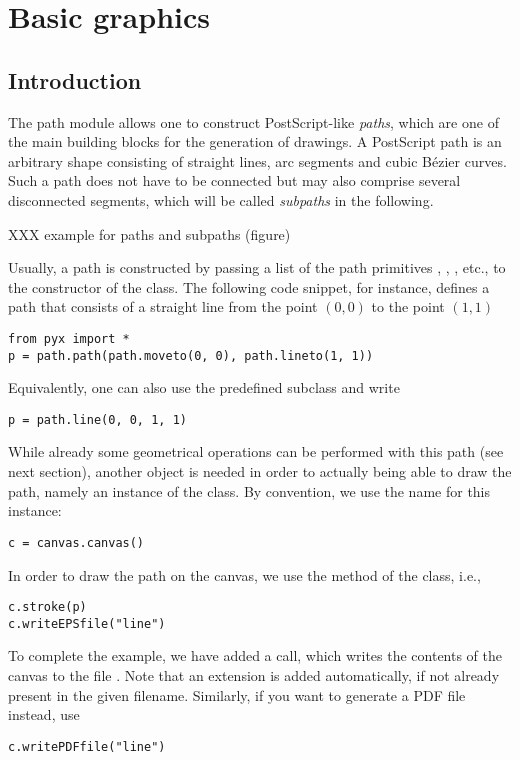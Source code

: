 \chapter{Basic graphics}


\label{graphics}

\section{Introduction}

The path module allows one to construct PostScript-like
\textit{paths}, which are one of the main building blocks for the
generation of drawings. A PostScript path is an arbitrary shape
consisting of straight lines, arc segments and cubic B\'ezier curves.
Such a path does not have to be connected but may also comprise
several disconnected segments, which will be called \textit{subpaths}
in the following. 

XXX example for paths and subpaths (figure)

Usually, a path is constructed by passing a list of the path
primitives , , , etc., to the
constructor of the  class. The following code snippet, for
instance, defines a path  that consists of a straight line
from the point $(0, 0)$ to the point $(1, 1)$
\begin{verbatim}
from pyx import *
p = path.path(path.moveto(0, 0), path.lineto(1, 1))
\end{verbatim}
Equivalently, one can also use the predefined  subclass
 and write
\begin{verbatim}
p = path.line(0, 0, 1, 1)
\end{verbatim}

While already some geometrical operations can be performed with this
path (see next section), another \PyX{} object is needed in order to
actually being able to draw the path, namely an instance of the
 class. By convention, we use the name  for this
instance:
\begin{verbatim}
c = canvas.canvas()
\end{verbatim}
In order to draw the path on the canvas, we use the  method
of the  class, i.e.,
\begin{verbatim}
c.stroke(p)
c.writeEPSfile("line")
\end{verbatim}
To complete the example, we have added a  call,
which writes the contents of the canvas to the file .
Note that an extension  is added automatically, if not
already present in the given filename. Similarly, if you want to 
generate a PDF file instead, use
\begin{verbatim}
c.writePDFfile("line")
\end{verbatim}


